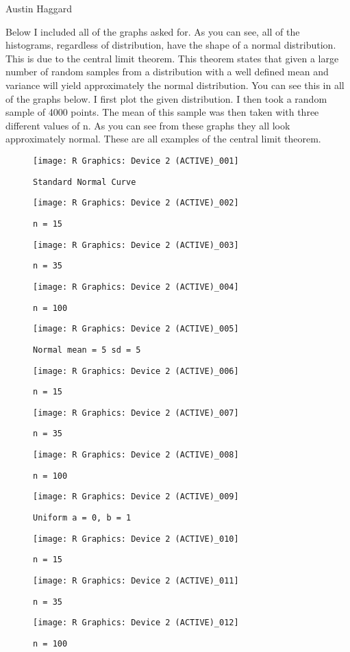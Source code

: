 \documentclass[11pt,twocolumn]{article}
\begin{document}
\begin{flushleft}
Austin Haggard
\end{flushleft}
\doublespace
Below I included all of the graphs asked for.  As you can see, all of the histograms, regardless of distribution, have the shape of a normal distribution.  This is due to the central limit theorem.  This theorem states that given a large number of random samples from a distribution with a well defined mean and variance will yield approximately the normal distribution.  You can see this in all of the graphs below.  I first plot the given distribution.  I then took a random sample of 4000 points.  The mean of this sample was then taken with three different values of n.  As you can see from these graphs they all look approximately normal.  These are all examples of the central limit theorem. 
\newpage
\begin{figure}[h!]
\texttt{[image: R Graphics: Device 2 (ACTIVE)\_001]}
\centering
\caption{\texttt{Standard Normal Curve}}

\texttt{[image: R Graphics: Device 2 (ACTIVE)\_002]}
\centering
\caption{\texttt{n = 15}}

\texttt{[image: R Graphics: Device 2 (ACTIVE)\_003]}
\centering
\caption{\texttt{n = 35}}

\texttt{[image: R Graphics: Device 2 (ACTIVE)\_004]}
\centering
\caption{\texttt{n = 100}}
\end{figure}

\begin{figure}[h!]
\texttt{[image: R Graphics: Device 2 (ACTIVE)\_005]}
\centering
\caption{\texttt{Normal mean = 5 sd = 5}}

\texttt{[image: R Graphics: Device 2 (ACTIVE)\_006]}
\centering
\caption{\texttt{n = 15}}

\texttt{[image: R Graphics: Device 2 (ACTIVE)\_007]}
\centering
\caption{\texttt{n = 35}}

\texttt{[image: R Graphics: Device 2 (ACTIVE)\_008]}
\centering
\caption{\texttt{n = 100}}
\end{figure}

\begin{figure}[h!]

\texttt{[image: R Graphics: Device 2 (ACTIVE)\_009]}
\centering
\caption{\texttt{Uniform a = 0, b = 1}}

\texttt{[image: R Graphics: Device 2 (ACTIVE)\_010]}
\centering
\caption{\texttt{n = 15}}

\texttt{[image: R Graphics: Device 2 (ACTIVE)\_011]}
\centering
\caption{\texttt{n = 35}}

\texttt{[image: R Graphics: Device 2 (ACTIVE)\_012]}
\centering
\caption{\texttt{n = 100}}
\end{figure}
\end{document}
